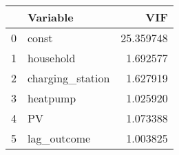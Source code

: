 \begin{tabular}{llr}
\toprule
 & Variable & VIF \\
\midrule
0 & const & 25.359748 \\
1 & household & 1.692577 \\
2 & charging_station & 1.627919 \\
3 & heatpump & 1.025920 \\
4 & PV & 1.073388 \\
5 & lag_outcome & 1.003825 \\
\bottomrule
\end{tabular}

